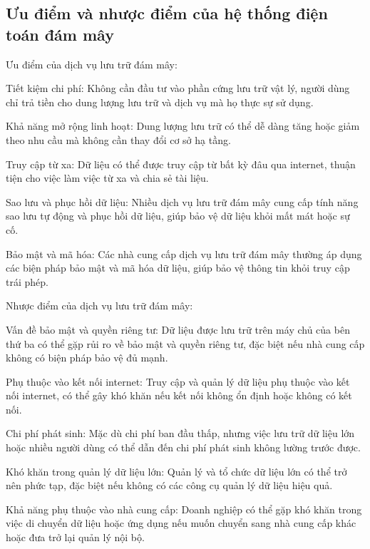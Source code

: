 \subsection{Ưu điểm và nhược điểm của hệ thống điện toán đám mây}
\begin{myitem}
\item Ưu điểm của dịch vụ lưu trữ đám mây:
  \begin{mysubitem}
  \item Tiết kiệm chi phí: Không cần đầu tư vào phần cứng lưu trữ vật lý, người dùng chỉ trả tiền cho dung lượng lưu trữ và dịch vụ mà họ thực sự sử dụng.
  \item Khả năng mở rộng linh hoạt: Dung lượng lưu trữ có thể dễ dàng tăng hoặc giảm theo nhu cầu mà không cần thay đổi cơ sở hạ tầng.
  \item Truy cập từ xa: Dữ liệu có thể được truy cập từ bất kỳ đâu qua internet, thuận tiện cho việc làm việc từ xa và chia sẻ tài liệu.
  \item Sao lưu và phục hồi dữ liệu: Nhiều dịch vụ lưu trữ đám mây cung cấp tính năng sao lưu tự động và phục hồi dữ liệu, giúp bảo vệ dữ liệu khỏi mất mát hoặc sự cố.
  \item Bảo mật và mã hóa: Các nhà cung cấp dịch vụ lưu trữ đám mây thường áp dụng các biện pháp bảo mật và mã hóa dữ liệu, giúp bảo vệ thông tin khỏi truy cập trái phép.
  \end{mysubitem}

\item Nhược điểm của dịch vụ lưu trữ đám mây:
  \begin{mysubitem}
  \item Vấn đề bảo mật và quyền riêng tư: Dữ liệu được lưu trữ trên máy chủ của bên thứ ba có thể gặp rủi ro về bảo mật và quyền riêng tư, đặc biệt nếu nhà cung cấp không có biện pháp bảo vệ đủ mạnh.
  \item Phụ thuộc vào kết nối internet: Truy cập và quản lý dữ liệu phụ thuộc vào kết nối internet, có thể gây khó khăn nếu kết nối không ổn định hoặc không có kết nối.
  \item Chi phí phát sinh: Mặc dù chi phí ban đầu thấp, nhưng việc lưu trữ dữ liệu lớn hoặc nhiều người dùng có thể dẫn đến chi phí phát sinh không lường trước được.
  \item Khó khăn trong quản lý dữ liệu lớn: Quản lý và tổ chức dữ liệu lớn có thể trở nên phức tạp, đặc biệt nếu không có các công cụ quản lý dữ liệu hiệu quả.
  \item Khả năng phụ thuộc vào nhà cung cấp: Doanh nghiệp có thể gặp khó khăn trong việc di chuyển dữ liệu hoặc ứng dụng nếu muốn chuyển sang nhà cung cấp khác hoặc đưa trở lại quản lý nội bộ.
  \end{mysubitem}
\end{myitem}

